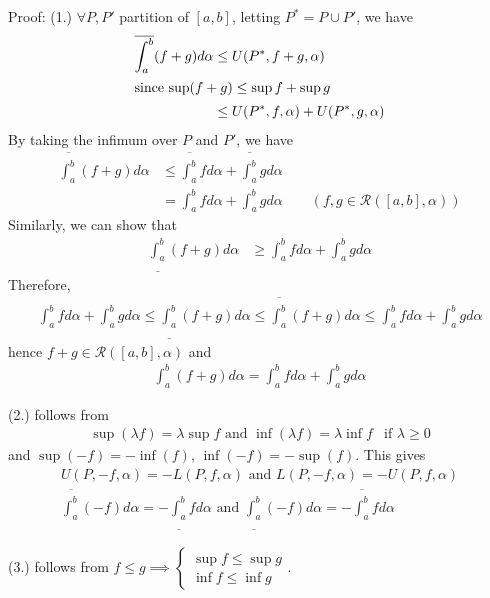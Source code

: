 \documentclass{tufte-handout}
\begin{document}
Proof: 
(1.)
\( \forall P, P' \) partition of \([a,b]\), letting 
\( P^* = P \cup P' \), we have
\begin{align}
    \overline{\int_{a}^{b}}(f+g)d\alpha &\leq U(P^*, f+g, \alpha)\\
    \intertext{since \( \sup(f+g)\leq \sup f + \sup g \)}
    &\leq U(P^*, f, \alpha) + U(P^*, g, \alpha)
\end{align}
By taking the infimum over \( P \) and \( P' \), we have
\begin{align}
    \overline{\int_{a}^{b}}(f+g)d\alpha &\leq \overline{\int_{a}^{b}}fd\alpha + \overline{\int_{a}^{b}}gd\alpha\\
    &= \int_{a}^{b} fd\alpha + \int_{a}^{b} gd\alpha \qquad (f,g \in \mathcal{R}([a,b], \alpha))
\end{align}
Similarly, we can show that
\begin{align}
    \underline{\int_{a}^{b}}(f+g)d\alpha &\geq \int_{a}^{b} fd\alpha + \int_{a}^{b} gd\alpha
\end{align}
Therefore, 
\begin{align}
    \int_{a}^{b}f d\alpha + \int_{a}^{b} gd\alpha \leq \underline{\int_{a}^{b}}(f+g)d\alpha \leq \overline{\int_{a}^{b}}(f+g)d\alpha \leq \int_{a}^{b} fd\alpha + \int_{a}^{b} gd\alpha
\end{align}
hence \( f+g \in \mathcal{R}([a,b], \alpha) \) and
\begin{align}
    \int_{a}^{b}(f+g)d\alpha = \int_{a}^{b} fd\alpha + \int_{a}^{b} gd\alpha
\end{align}

(2.) follows from 
\begin{align}
        \sup(\lambda f) = \lambda \sup f \text{ and } \inf(\lambda f) 
        = \lambda \inf f & \text{if } \lambda \geq 0
\end{align}
and \( \sup(-f) = -\inf(f) \), \( \inf(-f) = -\sup(f) \).
This gives 
\begin{align}
    U(P, -f, \alpha) = -L(P, f, \alpha) \text{ and } L(P, -f, \alpha) = -U(P, f, \alpha)\\
    \overline{\int_{a}^{b}}(-f)d\alpha = -\underline{\int_{a}^{b}}fd\alpha 
    \text{ and } \underline{\int_{a}^{b}}(-f)d\alpha = -\overline{\int_{a}^{b}}fd\alpha
\end{align}

(3.) follows from \( f\leq g \implies \begin{cases}
    \sup f \leq \sup g\\
    \inf f \leq \inf g
\end{cases} \).
\end{document}

